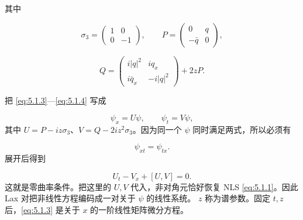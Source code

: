 \documentclass[
    lang=cn,
    scheme=chinese,
    mode=simple,
    device=normal,
    color=blue,
    math=cm,
    thmcnt=section,
    12pt
]{elegantbook}
\begin{document}
其中

\[
    \sigma_3=
    \begin{pmatrix}
        1 & 0  \\
        0 & -1
    \end{pmatrix},
    \qquad
    P=
    \begin{pmatrix}
        0       & q \\
        -\bar q & 0
    \end{pmatrix},
\]

\[
    Q=
    \begin{pmatrix}
        i\lvert q\rvert^2 & iq_x               \\
        i\bar q_x         & -i\lvert q\rvert^2
    \end{pmatrix}
    +2zP.
\]

\begin{callout}
    把 \eqref{eq:5.1.3}---\eqref{eq:5.1.4} 写成

    \[
        \psi_x=U\psi,\qquad \psi_t=V\psi,
    \]
    其中 $U=P-iz\sigma_3$、$V=Q-2iz^2\sigma_3$。因为同一个 $\psi$ 同时满足两式，所以必须有

    \[
        \psi_{xt}=\psi_{tx}.
    \]
    展开后得到

    \[
        U_t-V_x+[U,V]=0.
    \]
    这就是零曲率条件。把这里的 $U,V$ 代入，非对角元恰好恢复 NLS \eqref{eq:5.1.1}。因此 Lax 对把非线性方程编码成一对关于 $\psi$ 的线性系统。
    $z$ 称为谱参数。固定 $t,z$ 后，\eqref{eq:5.1.3} 是关于 $x$ 的一阶线性矩阵微分方程。
\end{callout}




\end{document}
